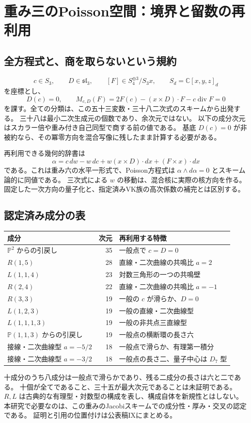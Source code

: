 \section{重み三のPoisson空間：境界と留数の再利用}
\label{sec:poisson-research-notes-v32}

\subsection{全方程式と、商を取らないという規約}
\[
 c\in S_3,\qquad D\in\mathfrak{sl}_3,\qquad
 [F]\in S_4^{\oplus3}/S_3x,
 \qquad S_d=\mathbb C[x,y,z]_d
\]
を座標とし、
\[
 D(c)=0,\qquad
 M_{c,D}(F)=2F(c)-(x\times D)\cdot F-c\operatorname{div}F=0
\]
を課す。全ての分類は、この五十三変数・三十八二次式のスキームから出発する。
三十八は最小二次生成元の個数であり、余次元ではない。
以下の成分次元はスカラー倍や重み付き自己同型で商する前の値である。
基底 $D(c)=0$ が非被約なら、その冪零方向を混合写像に残したまま計算する必要がある。

再利用できる幾何的辞書は
\[
 \alpha=c\,dw-w\,dc+w(x\times D)\cdot dx+(F\times x)\cdot dx
\]
である。これは重み六の水平一形式で、Poisson方程式は
$\alpha\wedge d\alpha=0$ とスキーム論的に同値である。
三次式による $w$ の移動は、混合核に実際の核方向を作る。
固定した一次方向の量子化と、指定済みVK族の高次係数の補完とは区別する。

\subsection{認定済み成分の表}
\begin{center}\small
\begin{tabular}{lrl}\toprule
成分&次元&再利用する特徴\\\midrule
$\mathbb P^2$ からの引戻し&35&一般点で $c=D=0$\\
$R(1,5)$&28&直線・二次曲線の共鳴比 $a=2$\\
$L(1,1,4)$&23&対数三角形の一つの共鳴壁\\
$R(2,4)$&22&直線・二次曲線の共鳴比 $a=-1$\\
$R(3,3)$&19&一般の $c$ が滑らか、$D=0$\\
$L(1,2,3)$&19&一般の直線・二次曲線型\\
$L(1,1,1,3)$&19&一般の非共点三直線型\\
$\mathbb P(1,1,3)$ からの引戻し&19&一般点の横断環の長さ六\\
接線・二次曲線型 $a=-5/2$&18&一般点で滑らか、有理第一積分\\
接線・二次曲線型 $a=-3/2$&18&一般点の長さ二、量子中心は $D_7$ 型\\\bottomrule
\end{tabular}
\end{center}
十成分のうち八成分は一般点で滑らかであり、残る二成分の長さは六と二である。
十個が全てであること、三十五が最大次元であることは未証明である。
$R,L$ は古典的な有理型・対数型の構成を表し、構成自体を新規性とはしない。
本研究で必要なのは、この重みのJacobiスキームでの成分性・厚み・交叉の認定である。
証明と引用の位置付けは公表稿IX\cite{PaperIX}にまとめる。

